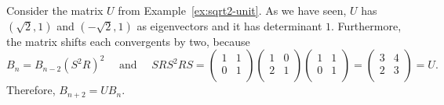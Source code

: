 \begin{example}
  Consider the matrix $U$ from Example~\ref{ex:sqrt2-unit}.
  As we have seen, $U$ has $(\sqrt{2}, 1)$ and $(-\sqrt{2}, 1)$ as eigenvectors
  and it has determinant $1$.
  Furthermore, the matrix shifts each convergents by two,
  because
  \[
    B_n = B_{n-2} (S^2 R)^2
    \quad
    \text{ and }
    \quad
    SRS^2RS =
    \begin{pmatrix}
      1 & 1 \\
      0 & 1 \\
    \end{pmatrix}
    \begin{pmatrix}
      1 & 0 \\
      2 & 1 \\
    \end{pmatrix}
    \begin{pmatrix}
      1 & 1 \\
      0 & 1 \\
    \end{pmatrix}
    =
    \begin{pmatrix}
      3 & 4 \\
      2 & 3 \\
    \end{pmatrix}
    = U.
  \]
  Therefore, $B_{n+2} = U B_n$.
\end{example}
